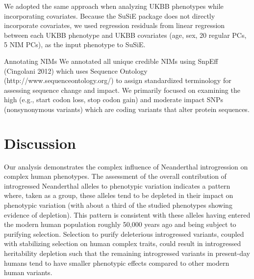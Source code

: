 We adopted the same approach when analyzing UKBB phenotypes while incorporating covariates. Because the SuSiE package does not directly incorporate covariates, we used regression residuals from linear regression between each UKBB phenotype and UKBB covariates (age, sex, 20 regular PCs, 5 NIM PCs), as the input phenotype to SuSiE.   

Annotating NIMs
We annotated all unique credible NIMs using SnpEff (Cingolani 2012) which uses Sequence Ontology (http://www.sequenceontology.org/) to assign standardized terminology for assessing sequence change and impact. We primarily focused on examining the high (e.g., start codon loss, stop codon gain) and moderate impact SNPs (nonsynonymous variants) which are coding variants that alter protein sequences.

\section{Discussion}
Our analysis demonstrates the complex influence of Neanderthal introgression on complex human phenotypes. The assessment of the overall contribution of introgressed Neanderthal alleles to phenotypic variation indicates a pattern where, taken as a group, these alleles tend to be depleted in their impact on phenotypic variation (with about a third of the studied phenotypes showing evidence of depletion). This pattern is consistent with these alleles having entered the modern human population roughly 50,000 years ago and being subject to purifying selection. Selection to purify deleterious introgressed variants, coupled with stabilizing selection on human complex traits, could result in introgressed heritability depletion such that the remaining introgressed variants in present-day humans tend to have smaller phenotypic effects compared to other modern human variants. 

